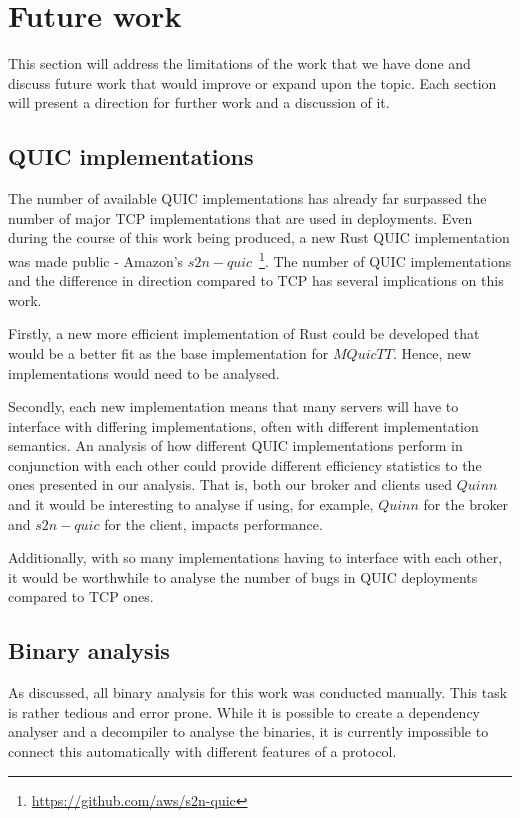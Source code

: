 \chapter{Future work} \label{chap:future_work}

This section will address the limitations of the work that we have done and discuss future work that would improve or expand upon the topic.
Each section will present a direction for further work and a discussion of it.

\section{QUIC implementations}

The number of available QUIC implementations has already far surpassed the number of major TCP implementations that are used in deployments.
Even during the course of this work being produced, a new Rust QUIC implementation was made public - Amazon's $s2n-quic$~\footnote{\url{https://github.com/aws/s2n-quic}}.
The number of QUIC implementations and the difference in direction compared to TCP has several implications on this work.

Firstly, a new more efficient implementation of Rust could be developed that would be a better fit as the base implementation for $MQuicTT$.
Hence, new implementations would need to be analysed.

Secondly, each new implementation means that many servers will have to interface with differing implementations, often with different implementation semantics.
An analysis of how different QUIC implementations perform in conjunction with each other could provide different efficiency statistics to the ones presented in our analysis.
That is, both our broker and clients used $Quinn$ and it would be interesting to analyse if using, for example, $Quinn$ for the broker and $s2n-quic$ for the client, impacts performance.

Additionally, with so many implementations having to interface with each other, it would be worthwhile to analyse the number of bugs in QUIC deployments compared to TCP ones.

\section{Binary analysis}

As discussed, all binary analysis for this work was conducted manually.
This task is rather tedious and error prone.
While it is possible to create a dependency analyser and a decompiler to analyse the binaries, it is currently impossible to connect this automatically with different features of a protocol.

